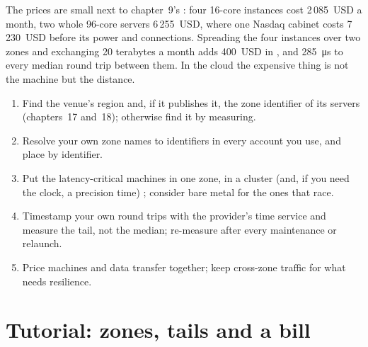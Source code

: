 The prices are small next to chapter~9's : four 16-core instances cost 2\,085~USD a month, two whole 96-core servers 6\,255~USD, where one
Nasdaq cabinet costs 7\,230~USD before its power and connections. Spreading the four instances over two zones and exchanging 20 terabytes a month adds
400~USD in , and \qty{285}{\micro\second} to every median round trip between them. In the cloud the expensive thing is not the
machine but the distance.

\begin{method}\label{met:nw:trading-in-a-public-cloud:place}
\begin{enumerate}
\item Find the venue's region and, if it publishes it, the zone identifier of its servers (chapters~17 and~18); otherwise find it by measuring.
\item Resolve your own zone names to identifiers in every account you use, and place by identifier.
\item Put the latency-critical machines in one zone, in a cluster (and, if you need the clock, a precision time) ; consider bare
  metal for the ones that race.
\item Timestamp your own round trips with the provider's time service and measure the tail, not the median; re-measure after every maintenance
  or relaunch.
\item Price machines and data transfer together; keep cross-zone traffic for what needs resilience.
\end{enumerate}
\end{method}

\section{Tutorial: zones, tails and a bill}\label{tut:nw:trading-in-a-public-cloud:tut}

